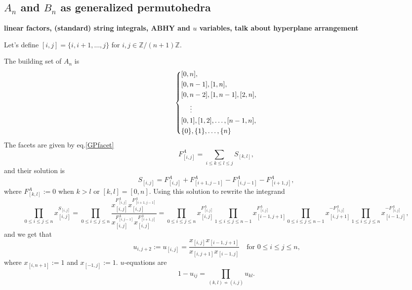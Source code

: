 \documentclass[hidelinks,12pt]{article}
\begin{document}
\subsection{$A_n$ and $B_n$ as generalized permutohedra} 

{\bf linear factors, (standard) string integrals, ABHY and $u$ variables, talk about hyperplane arrangement}

Let's define $[i,j]=\{i,i+1,\dots,j\}$ for $i,j\in \mathbb Z/(n+1)\mathbb Z$.

The building set of $A_n$ is
\[\left\{
\begin{aligned}
	&[0,n],\\
	&[0,n-1],[1,n],\\
	&[0,n-2],[1,n-1],[2,n],\\
	&\hspace{3ex}\vdots\\
	&[0,1],[1,2],\dots,[n-1,n],\\
	&\{0\},\{1\},\dots,\{n\}
\end{aligned}\right.
\]
The facets are given by eq.\eqref{GPfacet}
\[
F^A_{[i,j]}=\sum_{i\leq k\leq l\leq j}S_{[k,l]},
\]
and their solution is 
\[
S_{[i,j]}=F^A_{[i,j]}+F^A_{[i+1,j-1]}-F^A_{[i,j-1]}-F^A_{[i+1,j]},
\]
where $F^A_{[k,l]}:=0$ when $k>l$ or $[k,l]=[0,n]$. Using this solution to rewrite the integrand
\[
\prod_{0\leq i\leq j\leq n}x_{[i,j]}^{S_{[i,j]}}
=\prod_{0\leq i\leq j\leq n}\frac{x_{[i,j]}^{F^A_{[i,j]}}x_{[i,j]}^{F^A_{[i+1,j-1]}}}{x_{[i,j]}^{F^A_{[i,j-1]}}x_{[i,j]}^{F^A_{[i+1,j]}}}
=
\prod_{0\leq i\leq j\leq n}x_{[i,j]}^{F^A_{[i,j]}}
\prod_{1\leq i\leq j\leq n-1}x_{[i-1,j+1]}^{F^A_{[i,j]}}
\prod_{0\leq i\leq j\leq n-1}x_{[i,j+1]}^{-F^A_{[i,j]}}
\prod_{1\leq i\leq j\leq n}x_{[i-1,j]}^{-F^A_{[i,j]}},
\]
and we get that
\[
u_{i,j+2}:=u_{[i,j]}=\frac{x_{[i,j]}x_{[i-1,j+1]}}{x_{[i,j+1]}x_{[i-1,j]}} \quad \text{for $0\leq i\leq j\leq n$,}
\]
where $x_{[i,n+1]}:=1$ and  $x_{[-1,j]}:=1$. $u$-equations are
\[
1-u_{ij}=\prod_{(k,l)\not\sim (i,j)}u_{kl}.
\]
\end{document}
